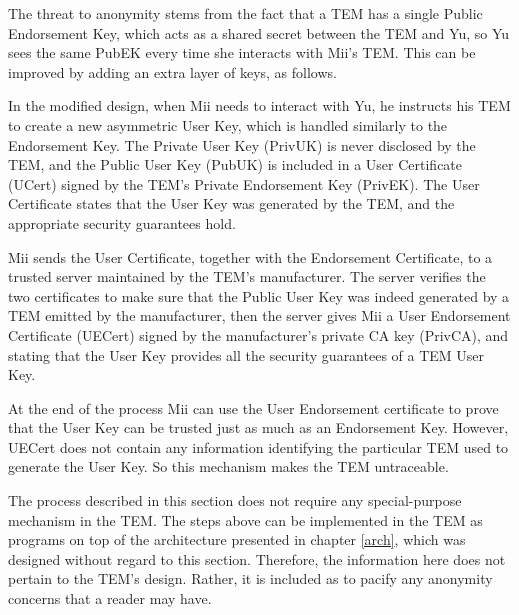 The threat to anonymity stems from the fact that a TEM has a single Public
Endorsement Key, which acts as a shared secret between the TEM and Yu, so Yu
sees the same PubEK every time she interacts with Mii's TEM. This can be
improved by adding an extra layer of keys, as follows.

In the modified design, when Mii needs to interact with Yu, he instructs his
TEM to create a new asymmetric User Key, which is handled similarly to the
Endorsement Key. The Private User Key (PrivUK) is never disclosed by the TEM,
and the Public User Key (PubUK) is included in a User Certificate (UCert)
signed by the TEM's Private Endorsement Key (PrivEK). The User Certificate
states that the User Key was generated by the TEM, and the appropriate security
guarantees hold.

Mii sends the User Certificate, together with the Endorsement Certificate, to a
trusted server maintained by the TEM's manufacturer. The server verifies the
two certificates to make sure that the Public User Key was indeed generated by
a TEM emitted by the manufacturer, then the server gives Mii a User Endorsement
Certificate (UECert) signed by the manufacturer's private CA key (PrivCA), and
stating that the User Key provides all the security guarantees of a TEM User Key.

At the end of the process Mii can use the User Endorsement certificate to prove
that the User Key can be trusted just as much as an Endorsement Key. However,
UECert does not contain any information identifying the particular TEM used to
generate the User Key. So this mechanism makes the TEM untraceable.

The process described in this section does not require any special-purpose
mechanism in the TEM. The steps above can be implemented in the TEM as programs
on top of the architecture presented in chapter \ref{arch}, which was designed
without regard to this section. Therefore, the information here does not
pertain to the TEM's design. Rather, it is included as to pacify any anonymity
concerns that a reader may have.
